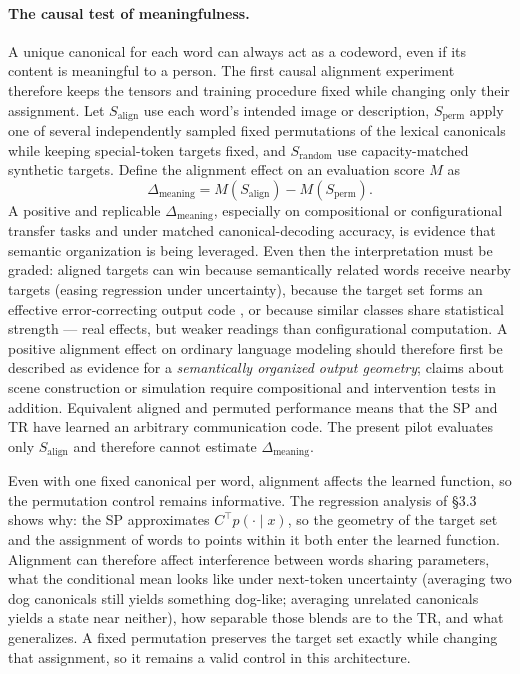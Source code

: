 \documentclass[11pt,a4paper]{article}
\begin{document}
\paragraph{The causal test of meaningfulness.} A unique canonical for each word can always act as a codeword, even if its content is meaningful to a person. The first causal alignment experiment therefore keeps the tensors and training procedure fixed while changing only their assignment. Let $S_{\mathrm{align}}$ use each word's intended image or description, $S_{\mathrm{perm}}$ apply one of several independently sampled fixed permutations of the lexical canonicals while keeping special-token targets fixed, and $S_{\mathrm{random}}$ use capacity-matched synthetic targets. Define the alignment effect on an evaluation score $M$ as
\[
  \Delta_{\mathrm{meaning}} = M(S_{\mathrm{align}}) - M(S_{\mathrm{perm}}).
\]
A positive and replicable $\Delta_{\mathrm{meaning}}$, especially on compositional or configurational transfer tasks and under matched canonical-decoding accuracy, is evidence that semantic organization is being leveraged. Even then the interpretation must be graded: aligned targets can win because semantically related words receive nearby targets (easing regression under uncertainty), because the target set forms an effective error-correcting output code \cite{ecoc2019}, or because similar classes share statistical strength --- real effects, but weaker readings than configurational computation. A positive alignment effect on ordinary language modeling should therefore first be described as evidence for a \emph{semantically organized output geometry}; claims about scene construction or simulation require compositional and intervention tests in addition. Equivalent aligned and permuted performance means that the SP and TR have learned an arbitrary communication code. The present pilot evaluates only $S_{\mathrm{align}}$ and therefore cannot estimate $\Delta_{\mathrm{meaning}}$.

Even with one fixed canonical per word, alignment affects the learned function, so the permutation control remains informative. The regression analysis of §3.3 shows why: the SP approximates $C^{\top}p(\cdot\mid x)$, so the geometry of the target set and the assignment of words to points within it both enter the learned function. Alignment can therefore affect interference between words sharing parameters, what the conditional mean looks like under next-token uncertainty (averaging two dog canonicals still yields something dog-like; averaging unrelated canonicals yields a state near neither), how separable those blends are to the TR, and what generalizes. A fixed permutation preserves the target set exactly while changing that assignment, so it remains a valid control in this architecture.
\end{document}
